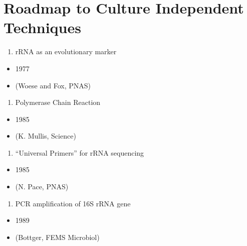 \documentclass[
]{book}
\providecommand{\tightlist}{%
  \setlength{\itemsep}{0pt}\setlength{\parskip}{0pt}}
\begin{document}
\hypertarget{roadmap-to-culture-independent-techniques}{%
\section{Roadmap to Culture Independent Techniques}\label{roadmap-to-culture-independent-techniques}}

\begin{enumerate}
\def\labelenumi{\arabic{enumi}.}
\tightlist
\item
  rRNA as an evolutionary marker
\end{enumerate}

\begin{itemize}
\tightlist
\item
  1977
\item
  (Woese and Fox, PNAS)
\end{itemize}

\begin{enumerate}
\def\labelenumi{\arabic{enumi}.}
\setcounter{enumi}{1}
\tightlist
\item
  Polymerase Chain Reaction
\end{enumerate}

\begin{itemize}
\tightlist
\item
  1985
\item
  (K. Mullis, Science)
\end{itemize}

\begin{enumerate}
\def\labelenumi{\arabic{enumi}.}
\setcounter{enumi}{2}
\tightlist
\item
  ``Universal Primers'' for rRNA sequencing
\end{enumerate}

\begin{itemize}
\tightlist
\item
  1985
\item
  (N. Pace, PNAS)
\end{itemize}

\begin{enumerate}
\def\labelenumi{\arabic{enumi}.}
\setcounter{enumi}{3}
\tightlist
\item
  PCR amplification of 16S rRNA gene
\end{enumerate}

\begin{itemize}
\tightlist
\item
  1989
\item
  (Bottger, FEMS Microbiol)
\end{itemize}
\end{document}
